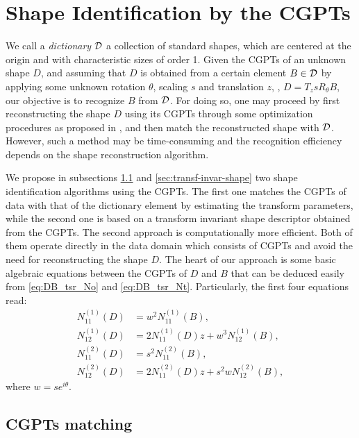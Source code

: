 \section{Shape Identification by the CGPTs}\label{sec:shape-ident-cgpt}

We call a \emph{dictionary} ${\mathcal{D}}$  a collection of standard
shapes, which are centered at the origin and with characteristic
sizes of order 1. Given the CGPTs of an unknown shape $D$, and
assuming that $D$ is obtained from a certain element $B\in{\mathcal{D}}$
by applying some unknown rotation $\theta$, scaling $s$ and
translation $z$, \ie, $D=T_zsR_\theta B$, our objective is to
recognize $B$ from ${\mathcal{D}}$. For doing so, one may proceed by first
reconstructing the shape $D$ using its CGPTs through some
optimization procedures as proposed in \cite{ammari2010conductivity}, and then
match the reconstructed shape with ${\mathcal{D}}$. However, such a method
may be time-consuming and the recognition efficiency depends on
the shape reconstruction algorithm.

We propose in subsections \ref{sec:cgpt-matching} and
\ref{sec:transf-invar-shape} two shape identification algorithms
using the CGPTs. The first one matches the CGPTs of data with that
of the dictionary element by estimating the transform parameters,
while the second one is based on a transform invariant shape
descriptor obtained from the CGPTs. The second approach is
computationally more efficient. Both of them operate directly in
the data domain which consists of CGPTs and avoid the need for
reconstructing the shape $D$. The heart of our approach is some
basic algebraic equations between the CGPTs of $D$ and $B$ that
can be deduced easily from \eqref{eq:DB_tsr_No} and
\eqref{eq:DB_tsr_Nt}. Particularly, the first four equations read:
\begin{align}
  N_{11}^{(1)}(D) &= w^2 N_{11}^{(1)}(B), \label{eq:No11}\\
  N_{12}^{(1)}(D) &= 2N_{11}^{(1)}(D)z + w^3 N_{12}^{(1)}(B), \label{eq:No12}\\
  N_{11}^{(2)}(D) &= s^2 N_{11}^{(2)}(B),\label{eq:Nt11}\\
  N_{12}^{(2)}(D) &= 2N_{11}^{(2)}(D)z + s^2wN_{12}^{(2)}(B),\label{eq:Nt12}
\end{align}
where $w=s e^{i \theta}$.

\subsection{CGPTs matching}
\label{sec:cgpt-matching}

